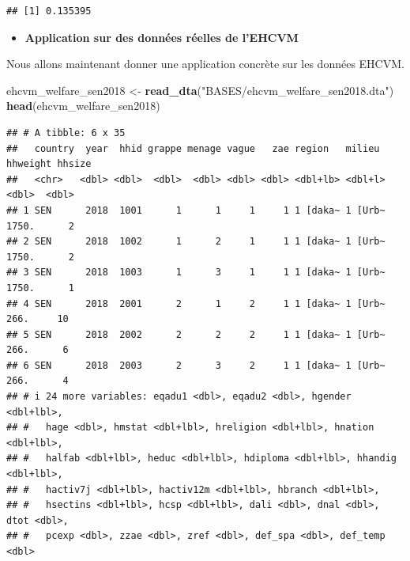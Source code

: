 \documentclass[
  12pt,
]{article}
\newenvironment{Shaded}{\begin{snugshade}}{\end{snugshade}}
\newcommand{\FunctionTok}[1]{\textcolor[rgb]{0.13,0.29,0.53}{\textbf{#1}}}
\newcommand{\NormalTok}[1]{#1}
\newcommand{\OtherTok}[1]{\textcolor[rgb]{0.56,0.35,0.01}{#1}}
\newcommand{\SpecialCharTok}[1]{\textcolor[rgb]{0.81,0.36,0.00}{\textbf{#1}}}
\newcommand{\StringTok}[1]{\textcolor[rgb]{0.31,0.60,0.02}{#1}}
\providecommand{\tightlist}{%
  \setlength{\itemsep}{0pt}\setlength{\parskip}{0pt}}
\begin{document}
\begin{verbatim}
## [1] 0.135395
\end{verbatim}

\begin{itemize}
\tightlist
\item
  \textbf{Application sur des données réelles de l'EHCVM}
\end{itemize}

Nous allons maintenant donner une application concrète sur les données
EHCVM.

\begin{Shaded}
\begin{Highlighting}[]
\NormalTok{ehcvm\_welfare\_sen2018 }\OtherTok{\textless{}{-}} \FunctionTok{read\_dta}\NormalTok{(}\StringTok{"BASES/ehcvm\_welfare\_sen2018.dta"}\NormalTok{)}
\FunctionTok{head}\NormalTok{(ehcvm\_welfare\_sen2018)}
\end{Highlighting}
\end{Shaded}

\begin{verbatim}
## # A tibble: 6 x 35
##   country  year  hhid grappe menage vague   zae region   milieu  hhweight hhsize
##   <chr>   <dbl> <dbl>  <dbl>  <dbl> <dbl> <dbl> <dbl+lb> <dbl+l>    <dbl>  <dbl>
## 1 SEN      2018  1001      1      1     1     1 1 [daka~ 1 [Urb~    1750.      2
## 2 SEN      2018  1002      1      2     1     1 1 [daka~ 1 [Urb~    1750.      2
## 3 SEN      2018  1003      1      3     1     1 1 [daka~ 1 [Urb~    1750.      1
## 4 SEN      2018  2001      2      1     2     1 1 [daka~ 1 [Urb~     266.     10
## 5 SEN      2018  2002      2      2     2     1 1 [daka~ 1 [Urb~     266.      6
## 6 SEN      2018  2003      2      3     2     1 1 [daka~ 1 [Urb~     266.      4
## # i 24 more variables: eqadu1 <dbl>, eqadu2 <dbl>, hgender <dbl+lbl>,
## #   hage <dbl>, hmstat <dbl+lbl>, hreligion <dbl+lbl>, hnation <dbl+lbl>,
## #   halfab <dbl+lbl>, heduc <dbl+lbl>, hdiploma <dbl+lbl>, hhandig <dbl+lbl>,
## #   hactiv7j <dbl+lbl>, hactiv12m <dbl+lbl>, hbranch <dbl+lbl>,
## #   hsectins <dbl+lbl>, hcsp <dbl+lbl>, dali <dbl>, dnal <dbl>, dtot <dbl>,
## #   pcexp <dbl>, zzae <dbl>, zref <dbl>, def_spa <dbl>, def_temp <dbl>
\end{verbatim}

\begin{Shaded}
\end{Shaded}
\end{document}
